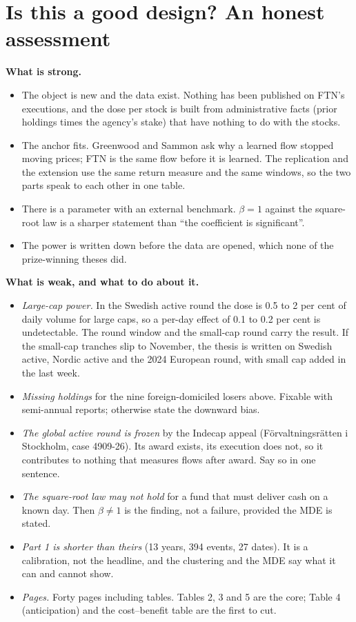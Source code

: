 \documentclass[11pt,a4paper]{article}
\begin{document}
\section{Is this a good design? An honest assessment}

\textbf{What is strong.}
\begin{itemize}[nosep]
\item The object is new and the data exist. Nothing has been published on FTN's executions, and the dose per stock is built from administrative facts (prior holdings times the agency's stake) that have nothing to do with the stocks.
\item The anchor fits. Greenwood and Sammon ask why a learned flow stopped moving prices; FTN is the same flow before it is learned. The replication and the extension use the same return measure and the same windows, so the two parts speak to each other in one table.
\item There is a parameter with an external benchmark. $\beta = 1$ against the square-root law is a sharper statement than ``the coefficient is significant''.
\item The power is written down before the data are opened, which none of the prize-winning theses did.
\end{itemize}

\textbf{What is weak, and what to do about it.}
\begin{itemize}[nosep]
\item \emph{Large-cap power.} In the Swedish active round the dose is 0.5 to 2 per cent of daily volume for large caps, so a per-day effect of 0.1 to 0.2 per cent is undetectable. The round window and the small-cap round carry the result. If the small-cap tranches slip to November, the thesis is written on Swedish active, Nordic active and the 2024 European round, with small cap added in the last week.
\item \emph{Missing holdings} for the nine foreign-domiciled losers above. Fixable with semi-annual reports; otherwise state the downward bias.
\item \emph{The global active round is frozen} by the Indecap appeal (Förvaltningsrätten i Stockholm, case 4909-26). Its award exists, its execution does not, so it contributes to nothing that measures flows after award. Say so in one sentence.
\item \emph{The square-root law may not hold} for a fund that must deliver cash on a known day. Then $\beta \ne 1$ is the finding, not a failure, provided the MDE is stated.
\item \emph{Part 1 is shorter than theirs} (13 years, 394 events, 27 dates). It is a calibration, not the headline, and the clustering and the MDE say what it can and cannot show.
\item \emph{Pages.} Forty pages including tables. Tables 2, 3 and 5 are the core; Table 4 (anticipation) and the cost--benefit table are the first to cut.
\end{itemize}
\end{document}
